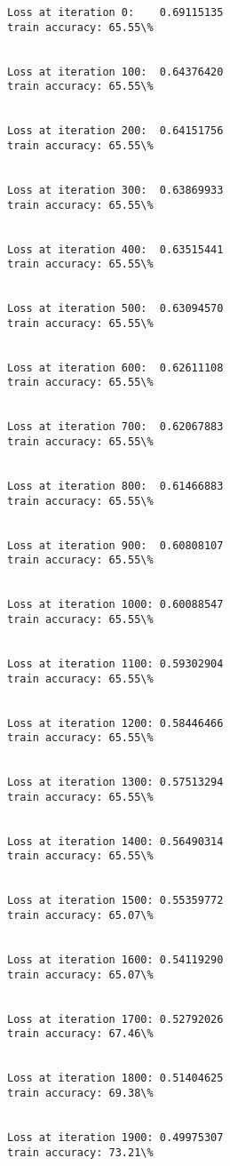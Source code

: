 \documentclass[11pt]{article}
\begin{document}
    \begin{Verbatim}[commandchars=\\\{\}]
Loss at iteration 0:	0.69115135
train accuracy: 65.55\%


Loss at iteration 100:	0.64376420
train accuracy: 65.55\%


Loss at iteration 200:	0.64151756
train accuracy: 65.55\%


Loss at iteration 300:	0.63869933
train accuracy: 65.55\%


Loss at iteration 400:	0.63515441
train accuracy: 65.55\%


Loss at iteration 500:	0.63094570
train accuracy: 65.55\%


Loss at iteration 600:	0.62611108
train accuracy: 65.55\%


Loss at iteration 700:	0.62067883
train accuracy: 65.55\%


Loss at iteration 800:	0.61466883
train accuracy: 65.55\%


Loss at iteration 900:	0.60808107
train accuracy: 65.55\%


Loss at iteration 1000:	0.60088547
train accuracy: 65.55\%


Loss at iteration 1100:	0.59302904
train accuracy: 65.55\%


Loss at iteration 1200:	0.58446466
train accuracy: 65.55\%


Loss at iteration 1300:	0.57513294
train accuracy: 65.55\%


Loss at iteration 1400:	0.56490314
train accuracy: 65.55\%


Loss at iteration 1500:	0.55359772
train accuracy: 65.07\%


Loss at iteration 1600:	0.54119290
train accuracy: 65.07\%


Loss at iteration 1700:	0.52792026
train accuracy: 67.46\%


Loss at iteration 1800:	0.51404625
train accuracy: 69.38\%


Loss at iteration 1900:	0.49975307
train accuracy: 73.21\%



    \end{Verbatim}
\end{document}
